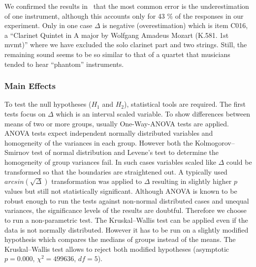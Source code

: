 We confirmed the results in~\cite{huron89} that the most common error is the underestimation of one instrument, although this accounts only for 43 \% of the responses in our experiment. Only in one case $\Delta$ is negative (overestimation) which is item C016, a ``Clarinet Quintet in A major by Wolfgang Amadeus Mozart (K.581. 1st mvmt)'' where we have excluded the solo clarinet part and two strings. Still, the remaining sound seems to be so similar to that of a quartet that musicians tended to hear ``phantom'' instruments.

\subsubsection*{Main Effects}

To test the null hypotheses ($H_1$ and $H_2$), statistical tools are required.
The first tests focus on $\Delta$ which is an interval scaled variable. To show differences between means of two or more groups, usually One-Way-ANOVA tests are applied. ANOVA tests expect independent normally distributed variables and homogeneity of the variances in each group. However both the Kolmogorov--Smirnov test of normal distribution and Levene's test to determine the homogeneity of group variances fail. In such cases variables scaled like $\Delta$ could be transformed so that the boundaries are straightened out. A typically used $arcsin(\sqrt{\Delta})$ transformation was applied to $\Delta$ resulting in slightly higher $p$ values but still not statistically significant. Although ANOVA is known to be robust enough to run the tests against non-normal distributed cases and unequal variances, the significance levels of the results are doubtful. Therefore we choose to run a non-parametric test. The Kruskal--Wallis test can be applied even if the data is not normally distributed. However it has to be run on a slightly modified hypothesis which compares the medians of groups instead of the means. The Kruskal--Wallis test allows to reject both modified hypotheses (asymptotic $p = 0.000$, $\chi^2 = 499636$, $df=5$).
